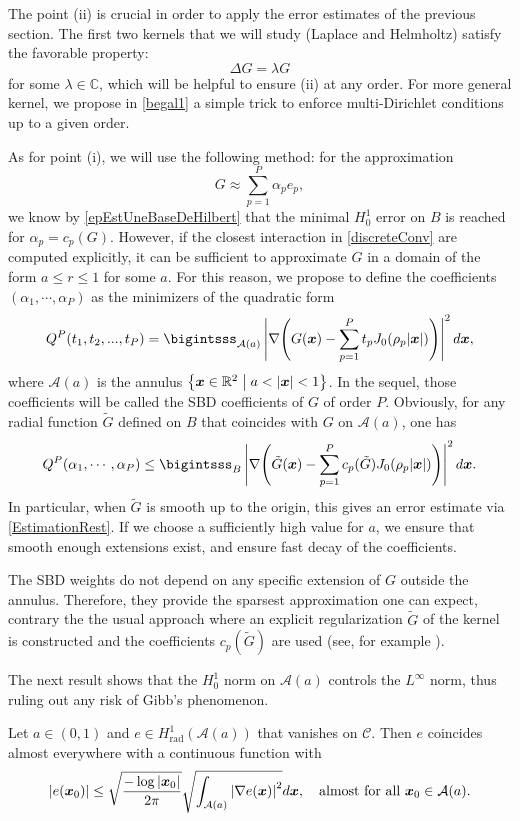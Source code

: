 \documentclass{article}
\begin{document}
The point (ii) is crucial in order to apply the error estimates of the previous section. The first two kernels that we will study (Laplace and Helmholtz) satisfy the favorable property:
\[\Delta G = \lambda G\]
for some $\lambda \in \mathbb{C}$, which will be helpful to ensure (ii) at any order. For more general kernel, we propose in \autoref{begal1} a simple trick to enforce multi-Dirichlet conditions up to a given order. 

As for point (i), we will use the following method: for the approximation 
\[G \approx \sum_{p = 1}^P \alpha_p e_p,\]
we know by \autoref{epEstUneBaseDeHilbert} that the minimal $H^1_0$ error on $B$ is reached for $\alpha_p = c_p(G)$. However, if the closest interaction in \eqref{discreteConv} are computed explicitly, it can be sufficient to approximate $G$ in a domain of the form $a \leq r \leq 1$ for some $a$. For this reason, we propose to define the coefficients $(\alpha_1,\cdots,\alpha_P)$ as the minimizers of the quadratic form
\[ Q^P(t_1,t_2,...,t_P) = \bigintsss_{\mathcal{A}(a)} \left|\nabla \!\left( G(\bs{x}) - \sum_{p=1}^P t_p J_0(\rho_p |\bs{x}|)\right)\right|^2d\bs{x},\]
where $\mathcal{A}(a)$ is the annulus $\left\{\boldsymbol{x} \in \mathbb{R}^2\mathrel{}\middle|\mathrel{}a < \left\lvert \boldsymbol{x} \right\rvert < 1\right\}$. In the sequel, those coefficients will be called the SBD coefficients of $G$ of order $P$. Obviously, for any radial function $\tilde{G}$ defined on $B$ that coincides with $G$ on $\mathcal{A}(a)$, one has 
\[ Q^P(\alpha_1,\cdots,\alpha_P) \leq \bigintsss_{B} \left|\nabla \!\left( \tilde{G}(\bs{x}) - \sum_{p=1}^P c_p(\tilde{G}) J_0(\rho_p |\bs{x}|)\right)\right|^2d\bs{x}. \]
In particular, when $\tilde{G}$ is smooth up to the origin, this gives an error estimate via \autoref{EstimationRest}. If we choose a sufficiently high value for $a$, we ensure that smooth enough extensions exist, and ensure fast decay of the coefficients. 			
\begin{Remark}
	\label{RemarkPotts}
	The SBD weights do not depend on any specific extension of $G$ outside the annulus. Therefore, they provide the sparsest approximation one can expect, contrary the the usual approach where an explicit regularization $\tilde{G}$ of the kernel is constructed and the coefficients $c_p(\tilde{G})$ are used (see, for example \cite{potts2004fast}). 
\end{Remark}									
The next result shows that the $H_0^1$ norm on $\mathcal{A}(a)$ controls the $L^{\infty}$ norm, thus ruling out any risk of Gibb's phenomenon.
\begin{lemma}
	Let $a\in (0,1)$ and $e\in H^1_{\text{rad}}(\mathcal{A}(a))$ that vanishes on $\mathcal{C}$. 
	Then $e$ coincides almost everywhere with a continuous function with
	\[\left\lvert e(\boldsymbol{x}_0) \right\rvert \leq \sqrt{\dfrac{-\log \left\lvert \boldsymbol{x}_0 \right\rvert}{2\pi}}\sqrt{\int_{\mathcal{A}(a)} \left\lvert \nabla e(\boldsymbol{x}) \right\rvert^2} d\boldsymbol{x},\quad  \text{almost for all }\boldsymbol{x}_0 \in \mathcal{A}(a).\]
\end{lemma}
\end{document}
